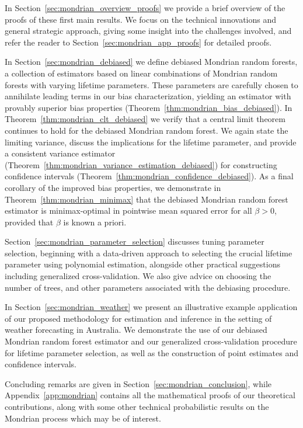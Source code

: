 In Section~\ref{sec:mondrian_overview_proofs} we provide a brief overview of
the proofs
of these first main results. We focus on the technical innovations and general
strategic approach, giving some insight into the challenges involved, and refer
the reader to Section~\ref{sec:mondrian_app_proofs} for detailed proofs.

In Section~\ref{sec:mondrian_debiased} we define debiased Mondrian random
forests, a
collection of estimators based on linear combinations of Mondrian random
forests with varying lifetime parameters. These parameters are carefully chosen
to annihilate leading terms in our bias characterization, yielding an estimator
with provably superior bias properties
(Theorem~\ref{thm:mondrian_bias_debiased}). In
Theorem~\ref{thm:mondrian_clt_debiased}
we verify that a central limit theorem continues to hold for the debiased
Mondrian random forest. We again state the limiting variance, discuss the
implications for the lifetime parameter, and provide a consistent variance
estimator (Theorem~\ref{thm:mondrian_variance_estimation_debiased}) for
constructing
confidence intervals (Theorem~\ref{thm:mondrian_confidence_debiased}). As a
final
corollary of the improved bias properties, we demonstrate in
Theorem~\ref{thm:mondrian_minimax} that the debiased Mondrian random forest
estimator is minimax-optimal in pointwise mean squared error for all
$\beta > 0$, provided that $\beta$ is known a priori.

Section~\ref{sec:mondrian_parameter_selection} discusses tuning parameter
selection,
beginning with a data-driven approach to selecting the crucial lifetime
parameter using polynomial estimation, alongside other practical suggestions
including generalized cross-validation.
We also give advice on choosing the number of trees, and other parameters
associated with the debiasing procedure.

In Section~\ref{sec:mondrian_weather} we present an illustrative example
application of our proposed methodology for estimation and inference in the
setting of weather forecasting in Australia. We demonstrate the use of
our debiased Mondrian random forest estimator and our
generalized cross-validation procedure for lifetime parameter selection,
as well as the construction of point estimates and confidence intervals.

Concluding remarks are given in Section~\ref{sec:mondrian_conclusion}, while
Appendix~\ref{app:mondrian} contains all the mathematical proofs of our
theoretical contributions, along with some other technical
probabilistic results on the Mondrian process which may be of interest.

